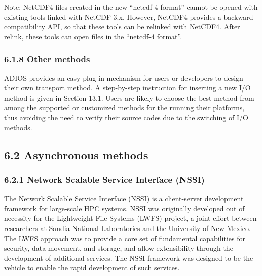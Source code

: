 \vspace{10pt}
Note: NetCDF4 files created in the new ``netcdf-4 format'' cannot be opened with 
existing tools linked with NetCDF 3.x.  However, NetCDF4 provides a backward compatibility 
API, so that these tools can be relinked with NetCDF4.  After relink, these tools 
can open files in the ``netcdf-4 format''.\label{HToc182553388}

\vspace{10pt}
\subsubsection*{{\large \textbf{6.1.8 Other methods}}}

\vspace{10pt}
ADIOS provides an easy plug-in mechanism for users or developers to design their 
own transport method. A step-by-step instruction for inserting a new I/O method 
is given in Section 13.1. Users are likely to choose the best method from among 
the supported or customized methods for the running their platforms, thus avoiding 
the need to verify their source codes due to the switching of I/O methods.\label{HToc182553389}

\vspace{10pt}
\subsection*{{\large 6.2 }{\large \textbf{Asynchronous methods\label{HToc182553390}}}}

\vspace{10pt}
\subsubsection*{{\large \textbf{6.2.1 Network Scalable Service Interface (NSSI)}}}

\vspace{10pt}
The Network Scalable Service Interface (NSSI) is a client-server development framework 
for large-scale HPC systems.  NSSI was originally developed out of necessity for 
the Lightweight File Systems (LWFS) project, a joint effort between researchers 
at Sandia National Laboratories and the University of New Mexico.  The LWFS approach 
was to provide a core set of fundamental capabilities for security, data-movement, 
and storage, and allow extensibility through the development of additional services. 
 The NSSI framework was designed to be the vehicle to enable the rapid development 
of such services.


